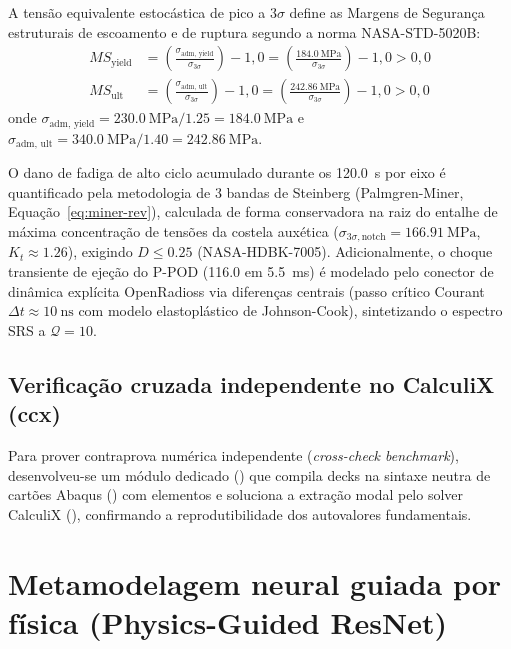 A tensão equivalente estocástica de pico a $3\sigma$ define as Margens de Segurança estruturais de escoamento e de ruptura segundo a norma NASA-STD-5020B:
\begin{align}
  MS_{\text{yield}} &= \left( \frac{\sigma_{\text{adm, yield}}}{\sigma_{3\sigma}} \right) - 1{,}0 = \left( \frac{\SI{184.0}{\mega\pascal}}{\sigma_{3\sigma}} \right) - 1{,}0 > 0{,}0 \label{eq:ms-y-calc} \\
  MS_{\text{ult}} &= \left( \frac{\sigma_{\text{adm, ult}}}{\sigma_{3\sigma}} \right) - 1{,}0 = \left( \frac{\SI{242.86}{\mega\pascal}}{\sigma_{3\sigma}} \right) - 1{,}0 > 0{,}0 \label{eq:ms-u-calc}
\end{align}
onde $\sigma_{\text{adm, yield}} = \SI{230.0}{\mega\pascal} / \num{1.25} = \SI{184.0}{\mega\pascal}$ e $\sigma_{\text{adm, ult}} = \SI{340.0}{\mega\pascal} / \num{1.40} = \SI{242.86}{\mega\pascal}$.

O dano de fadiga de alto ciclo acumulado durante os \SI{120.0}{\second} por eixo é quantificado pela metodologia de 3 bandas de Steinberg (Palmgren-Miner, Equação~\eqref{eq:miner-rev}), calculada de forma conservadora na raiz do entalhe de máxima concentração de tensões da costela auxética ($\sigma_{3\sigma,\text{notch}} = \SI{166.91}{\mega\pascal}$, $K_t \approx \num{1.26}$), exigindo $D \le \num{0.25}$ (NASA-HDBK-7005). Adicionalmente, o choque transiente de ejeção do P-POD (\SI{116.0}{\gravity} em \SI{5.5}{\milli\second}) é modelado pelo conector de dinâmica explícita OpenRadioss via diferenças centrais (passo crítico Courant $\Delta t \approx \SI{10}{\nano\second}$ com modelo elastoplástico de Johnson-Cook), sintetizando o espectro SRS a $\mathcal{Q} = 10$.

\subsection{Verificação cruzada independente no CalculiX (ccx)}
\label{subsec:metod-calculix}
Para prover contraprova numérica independente (\textit{cross-check benchmark}), desenvolveu-se um módulo dedicado () que compila decks na sintaxe neutra de cartões Abaqus () com elementos  e soluciona a extração modal pelo solver CalculiX (), confirmando a reprodutibilidade dos autovalores fundamentais.

\section{Metamodelagem neural guiada por física (Physics-Guided ResNet)}
\label{sec:metod-neural}


